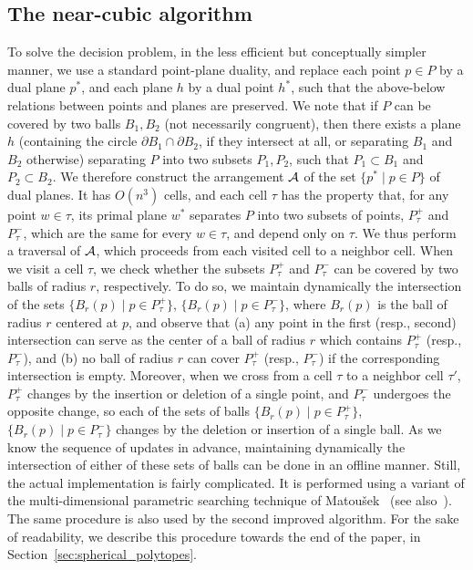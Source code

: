 \documentclass[a4paper,12pt]{article}
\def\A{{\cal A}}
\def\bd{{\partial}}
\begin{document}
\subsection{The near-cubic algorithm}
\label{subsec:n^3_sketch} To solve the decision problem, in the less
efficient but conceptually simpler manner, we use a standard
point-plane duality, and replace each point $p \in P$ by a dual
plane $p^*$, and each plane $h$ by a dual point $h^*$, such that the
above-below relations between points and planes are preserved. We
note that if $P$ can be covered by two balls $B_1, B_2$ (not
necessarily congruent), then there exists a plane $h$ (containing
the circle $\bd{B_1} \cap \bd{B_2}$, if they intersect at all, or
separating $B_1$ and $B_2$ otherwise) separating $P$ into two
subsets $P_1, P_2$, such that $P_1 \subset B_1$ and $P_2 \subset
B_2$. We therefore construct the arrangement $\A$ of the set $\{p^*
\mid p \in P\}$ of dual planes. It has $O(n^3)$ cells, and each cell
$\tau$ has the property that, for any point $w \in \tau$, its primal
plane $w^*$ separates $P$ into two subsets of points, $P_\tau^+$ and
$P_\tau^-$, which are the same for every $w \in \tau$, and depend
only on $\tau$. We thus perform a traversal of $\A$, which proceeds
from each visited cell to a neighbor cell. When we visit a cell
$\tau$, we check whether the subsets $P_\tau^+$ and $P_\tau^-$ can
be covered by two balls of radius $r$, respectively. To do so, we
maintain dynamically the intersection of the sets $\{B_r(p)\mid p
\in P_\tau^+\}$, $\{B_r(p)\mid p \in P_\tau^-\}$, where $B_r(p)$ is
the ball of radius $r$ centered at $p$, and observe that (a) any
point in the first (resp., second) intersection can serve as the
center of a ball of radius $r$ which contains $P_\tau^+$ (resp.,
$P_\tau^-$), and (b) no ball of radius $r$ can cover $P_\tau^+$
(resp., $P_\tau^-$) if the corresponding intersection is empty.
Moreover, when we cross from a cell $\tau$ to a neighbor cell
$\tau'$, $P_\tau^+$ changes by the insertion or deletion of a single
point, and $P_\tau^-$ undergoes the opposite change, so each of the
sets of balls $\{B_r(p)\mid p \in P_\tau^+\}$, $\{B_r(p)\mid p \in
P_\tau^-\}$ changes by the deletion or insertion of a single ball.
As we know the sequence of updates in advance, maintaining
dynamically the intersection of either of these sets of balls can be
done in an offline manner. Still, the actual implementation is
fairly complicated. It is performed using a variant of the
multi-dimensional parametric searching technique of
Matou\v{s}ek~\cite{JM} (see also~\cite{TCA, CMS, NPT}). The same
procedure is also used by the second improved algorithm. For the
sake of readability, we describe this procedure towards the end of
the paper, in Section~\ref{sec:spherical_polytopes}.
\end{document}

